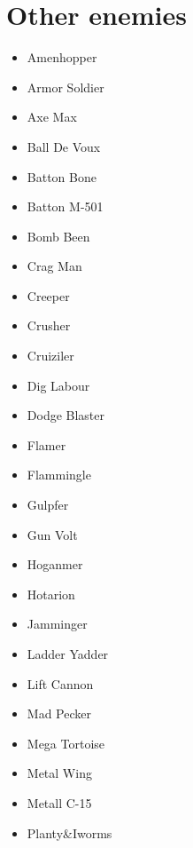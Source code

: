 \section{Other enemies}
\begin{itemize}
	\item \hypertarget{enem:Amenhopper}{Amenhopper}
	\item \hypertarget{enem:Armor_Soldier}{Armor Soldier}
	\item \hypertarget{enem:Axe_Max}{Axe Max}
	\item \hypertarget{enem:Ball_De_Voux}{Ball De Voux}
	\item \hypertarget{enem:Batton_Bone}{Batton Bone}
	\item \hypertarget{enem:Batton_M-501}{Batton M-501} 
	\item \hypertarget{enem:Bomb_Been}{Bomb Been}
	\item \hypertarget{enem:Crag_Man} {Crag Man}
	\item \hypertarget{enem:Creeper} {Creeper}
	\item \hypertarget{enem:Crusher}{Crusher}
	\item \hypertarget{enem:Cruiziler}{Cruiziler}
	\item \hypertarget{enem:Dig_Labour}{Dig Labour}
	\item \hypertarget{enem:Dodge_Blaster}{Dodge Blaster}
	\item \hypertarget{enem:Flamer}{Flamer} 
	\item \hypertarget{enem:Flammingle}{Flammingle}
	\item \hypertarget{enem:Gulpfer}{Gulpfer}
	\item \hypertarget{enem:Gun_Volt}{Gun Volt}
	\item \hypertarget{enem:Hoganmer}{Hoganmer}
	\item \hypertarget{enem:Hotarion}{Hotarion}
	\item \hypertarget{enem:Jamminger}{Jamminger}
	\item \hypertarget{enem:Ladder_Yadder}{Ladder Yadder}
	\item \hypertarget{enem:Lift Cannon}{Lift Cannon}
	\item \hypertarget{enem:Mad_Pecker} {Mad Pecker}
	\item \hypertarget{enem:Mega_Tortoise}{Mega Tortoise}
	\item \hypertarget{enem:Metal_Wing}{Metal Wing}
	\item \hypertarget{enem:Metall_C-15}{Metall C-15} 
	\item \hypertarget{enem:Planty_Iworms} {Planty\&Iworms}

\end{itemize}
